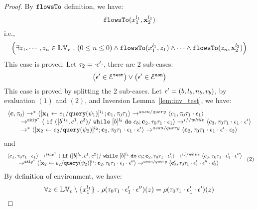 \begin{proof}
By $\mathtt{flowsTo}$ definition, we have:
%
\[
\mathtt{flowsTo}(x_1^{l_1}, {\boldsymbol{\mathbf{x}}}_2^{l_2})
\]
i.e.,
%
\[
 \Big( \exists z_1, \cdots, z_n \in \mathbb{LV}_{{\boldsymbol{\mathbf{c}}}} ~.~ (0 \leq n \leq 0 )
 \land \mathtt{flowsTo}(x_1^{l_1}, z_1) \land \cdots \land \mathtt{flowsTo}(z_n, {\boldsymbol{\mathbf{x}}}_2^{l_2}) \Big)
\]
%
This case is proved.
%
%
Let $\mathtt{\tau}_2 = \cdot \mathtt{\epsilon}' \cdot$, there are 2 sub-cases: 
%
 \[
 \big(\mathtt{\epsilon}' \in \mathcal{E}^{\mathtt{{test}}}\big) \lor \big(\mathtt{\epsilon}' \in \mathcal{E}^{\mathtt{{asn}}}\big)
 \]
%
This case is proved by splitting the 2 sub-cases.
%
Let $\mathtt{\epsilon}' = (b, l_b, n_b, v_b)$, by evaluation $(1)$ and $(2)$, and {Inversion Lemma~\ref{lem:inv_test}}, we have:
\[
  \begin{array}{l}   
\langle {\boldsymbol{\mathbf{c}}}, \mathtt{\tau}_0 \rangle \rightarrow^{*} 
\langle [\mathrel{ {\boldsymbol{\mathbf{x}}}_1 \leftarrow e_1 / {\tt query}(\psi_1) }]^{l_1} ; {\boldsymbol{\mathbf{c}}}_1, \mathtt{\tau}_0 \mathtt{\tau}_1 \rangle  
\rightarrow^{assn/query}
 \langle c_1, \mathtt{\tau}_0 \mathtt{\tau}_1 \cdot \mathtt{\epsilon}_1 \rangle 
 \\
  \qquad \rightarrow^{\mathtt{skip}^*} 
  \langle \;\mathtt{if}\; ([b]^{l_b}, c^1, c^2) / \;\mathtt{while}\; [b]^{l_b} \;\mathtt{do}\; c_b;{\boldsymbol{\mathbf{c}}}_2, 
  \mathtt{\tau}_0 \mathtt{\tau}_1 \cdot \mathtt{\epsilon}_1 \rangle 
 \rightarrow^{if / while} 
  \langle c_3, 
  \mathtt{\tau}_0 \mathtt{\tau}_1 \cdot \mathtt{\epsilon}_1 \cdot \mathtt{\epsilon}' \rangle 
  \\
  \qquad   \rightarrow^{*} 
  \langle [\mathrel{ {\boldsymbol{\mathbf{x}}}_2 \leftarrow e_2 / {\tt query}(\psi_2) }]^{l_2};{\boldsymbol{\mathbf{c}}}_2, 
  \mathtt{\tau}_0 \mathtt{\tau}_1 \cdot \mathtt{\epsilon}_1 \cdot \mathtt{\epsilon}' \rangle 
  \rightarrow^{assn/query} 
  \langle {\boldsymbol{\mathbf{c}}}_2,  \mathtt{\tau}_0 \mathtt{\tau}_1 \cdot \mathtt{\epsilon}_1 \cdot \mathtt{\epsilon}' \cdot \mathtt{\epsilon}_2 \rangle 
\end{array}
 \]
 and 
  \[
  \begin{array}{l}   
  \langle c_1, \mathtt{\tau}_0 \mathtt{\tau}_1 \cdot \mathtt{\epsilon}_1 \rangle 
  \rightarrow^{\mathtt{skip}^*} 
  \langle \;\mathtt{if}\; ([b]^{l_b}, c^1, c^2) / \;\mathtt{while}\; [b]^{l_b} \;\mathtt{do}\; c_b;{\boldsymbol{\mathbf{c}}}_2, 
  \mathtt{\tau}_0 \mathtt{\tau}_1 \cdot \mathtt{\epsilon}_1' \rangle 
  \rightarrow^{if / while} 
  \langle c_3, 
  \mathtt{\tau}_0 \mathtt{\tau}_1 \cdot \mathtt{\epsilon}_1' \cdot \mathtt{\epsilon}'' \rangle 
  \\
  \qquad \rightarrow^{\mathtt{skip}^*} 
  \langle [\mathrel{ {\boldsymbol{\mathbf{x}}}_2 \leftarrow e_2 / {\tt query}(\psi_2) }]^{l_2};{\boldsymbol{\mathbf{c}}}_2, 
  \mathtt{\tau}_0 \mathtt{\tau}_1 \cdot \mathtt{\epsilon}_1\cdot \mathtt{\epsilon}'' \rangle 
  \rightarrow^{assn/query} 
  \langle {\boldsymbol{\mathbf{c}}}_2',  \mathtt{\tau}_0 \mathtt{\tau}_1 \cdot \mathtt{\epsilon}_1' \cdot \mathtt{\epsilon}'' \cdot \mathtt{\epsilon}_2' \rangle 
\end{array} ~(2)
 \]
%
By definition of environment, we have:
\[
  \forall z \in \mathbb{LV}_c \setminus \{x_1^{l_1}\} ~.~
  \rho(\mathtt{\tau}_0 \mathtt{\tau}_1 \cdot \mathtt{\epsilon}_1' \cdot \mathtt{\epsilon}'') (z) =  
  \rho(\mathtt{\tau}_0 \mathtt{\tau}_1 \cdot \mathtt{\epsilon}_1' \cdot \mathtt{\epsilon}') (z)
\]
\end{proof}

